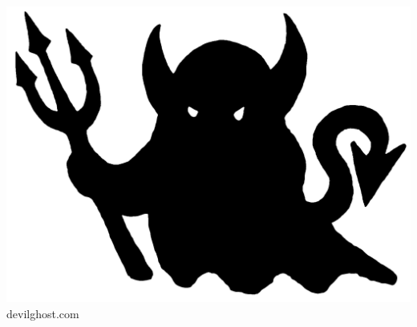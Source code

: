 \begin{titlepage}
\begin{center}
    \vspace{2ex}
	\includegraphics[scale=.125]{img/devilghost.png} \\
	\footnotesize devilghost.com
    \end{center}
\end{titlepage}
\clearpage

\blankpage

\renewcommand\thepage{}
\thispagestyle{empty}
{\footnotesize \tableofcontents}
\clearpage
\renewcommand\thepage{\arabic{page}}

